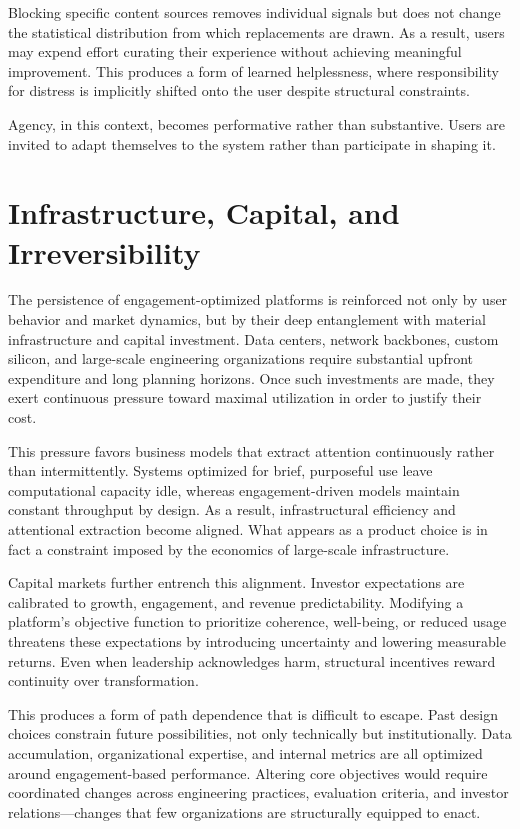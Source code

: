\documentclass[12pt]{article}
\begin{document}
Blocking specific content sources removes individual signals but does not change the statistical distribution from which replacements are drawn. As a result, users may expend effort curating their experience without achieving meaningful improvement. This produces a form of learned helplessness, where responsibility for distress is implicitly shifted onto the user despite structural constraints.

Agency, in this context, becomes performative rather than substantive. Users are invited to adapt themselves to the system rather than participate in shaping it.

\section{Infrastructure, Capital, and Irreversibility}

The persistence of engagement-optimized platforms is reinforced not only by user behavior and market dynamics, but by their deep entanglement with material infrastructure and capital investment. Data centers, network backbones, custom silicon, and large-scale engineering organizations require substantial upfront expenditure and long planning horizons. Once such investments are made, they exert continuous pressure toward maximal utilization in order to justify their cost.

This pressure favors business models that extract attention continuously rather than intermittently. Systems optimized for brief, purposeful use leave computational capacity idle, whereas engagement-driven models maintain constant throughput by design. As a result, infrastructural efficiency and attentional extraction become aligned. What appears as a product choice is in fact a constraint imposed by the economics of large-scale infrastructure.

Capital markets further entrench this alignment. Investor expectations are calibrated to growth, engagement, and revenue predictability. Modifying a platform’s objective function to prioritize coherence, well-being, or reduced usage threatens these expectations by introducing uncertainty and lowering measurable returns. Even when leadership acknowledges harm, structural incentives reward continuity over transformation.

This produces a form of path dependence that is difficult to escape. Past design choices constrain future possibilities, not only technically but institutionally. Data accumulation, organizational expertise, and internal metrics are all optimized around engagement-based performance. Altering core objectives would require coordinated changes across engineering practices, evaluation criteria, and investor relations—changes that few organizations are structurally equipped to enact.
\end{document}
